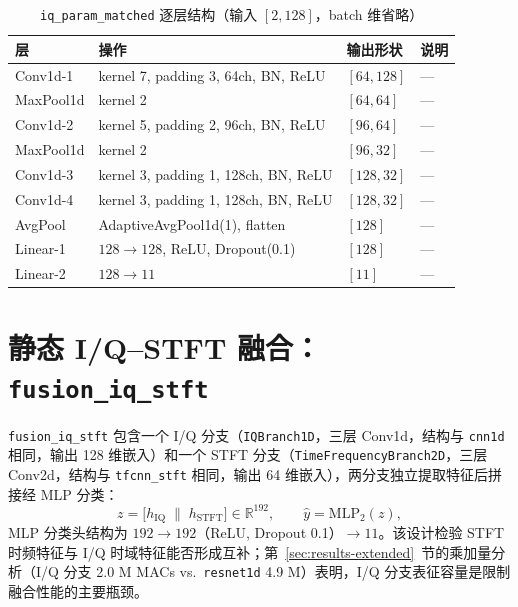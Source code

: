 \begin{table}[htbp]
  \centering
  \caption{\texttt{iq\_param\_matched} 逐层结构（输入 \([2,128]\)，batch 维省略）}
  \label{tab:arch-iqpm}
  \small
  \begin{tabular}{llll}
    \toprule
    层 & 操作 & 输出形状 & 说明 \\
    \midrule
    Conv1d-1  & kernel 7, padding 3, 64ch, BN, ReLU  & \([64,128]\) & --- \\
    MaxPool1d & kernel 2                               & \([64, 64]\) & --- \\
    Conv1d-2  & kernel 5, padding 2, 96ch, BN, ReLU  & \([96, 64]\) & --- \\
    MaxPool1d & kernel 2                               & \([96, 32]\) & --- \\
    Conv1d-3  & kernel 3, padding 1, 128ch, BN, ReLU & \([128,32]\) & --- \\
    Conv1d-4  & kernel 3, padding 1, 128ch, BN, ReLU & \([128,32]\) & --- \\
    AvgPool   & AdaptiveAvgPool1d(1), flatten          & \([128]\)    & --- \\
    Linear-1  & \(128\to128\), ReLU, Dropout(0.1)    & \([128]\)    & --- \\
    Linear-2  & \(128\to11\)                          & \([11]\)     & --- \\
    \bottomrule
  \end{tabular}
\end{table}

\section{静态 I/Q--STFT 融合：\texttt{fusion\_iq\_stft}}\label{sec:method-static-fusion}

\texttt{fusion\_iq\_stft} 包含一个 I/Q 分支（\texttt{IQBranch1D}，三层 Conv1d，结构与 \texttt{cnn1d} 相同，输出 128 维嵌入）和一个 STFT 分支（\texttt{TimeFrequencyBranch2D}，三层 Conv2d，结构与 \texttt{tfcnn\_stft} 相同，输出 64 维嵌入），两分支独立提取特征后拼接经 MLP 分类：
\begin{equation}
  z = \bigl[h_{\mathrm{IQ}}\;\|\;h_{\mathrm{STFT}}\bigr]\in\mathbb{R}^{192},\qquad
  \hat{y} = \mathrm{MLP}_2(z),
  \label{eq:static-fusion}
\end{equation}
MLP 分类头结构为 \(192\to192\)（ReLU, Dropout 0.1）\(\to11\)。该设计检验 STFT 时频特征与 I/Q 时域特征能否形成互补；第~\ref{sec:results-extended}~节的乘加量分析（I/Q 分支 2.0 M MACs vs.\ \texttt{resnet1d} 4.9 M）表明，I/Q 分支表征容量是限制融合性能的主要瓶颈。

